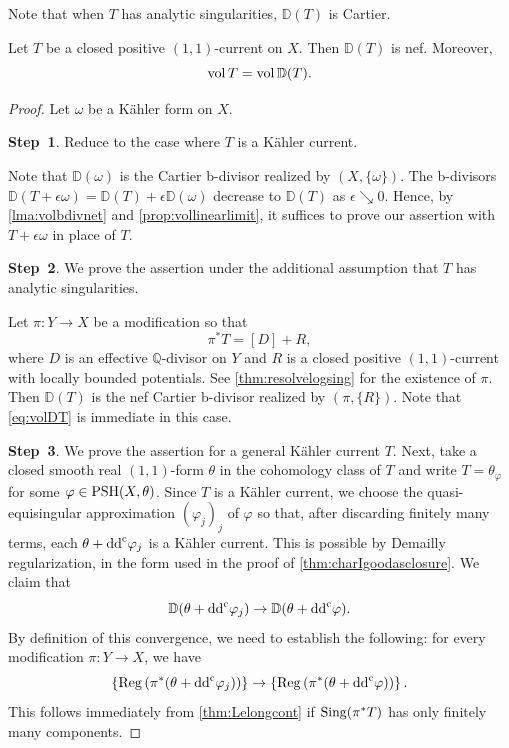 Note that when $T$ has analytic singularities, $\mathbb{D}(T)$ is Cartier.

\begin{theorem}\label{thm:DT}
    Let $T$ be a closed positive $(1,1)$-current on $X$. Then $\mathbb{D}(T)$ is nef. Moreover,
    \begin{equation}\label{eq:volDT}
    \operatorname{vol} T=\operatorname{vol} \mathbb{D}(T).
    \end{equation}
\end{theorem}

\begin{proof}
    Let $\omega$ be a Kähler form on $X$.

    \textbf{Step~1}. Reduce to the case where $T$ is a Kähler current.

    Note that $\mathbb{D}(\omega)$ is the Cartier b-divisor realized by $(X,\{\omega\})$.
    The b-divisors $\mathbb{D}(T+\epsilon\omega)=\mathbb{D}(T)+\epsilon \mathbb{D}(\omega)$ decrease to $\mathbb{D}(T)$ as $\epsilon\searrow 0$. Hence, by \cref{lma:volbdivnet} and \cref{prop:vollinearlimit}, it suffices to prove our assertion with $T+\epsilon\omega$ in place of $T$.

    \textbf{Step~2}. We prove the assertion under the additional assumption that $T$ has analytic singularities.

    Let $\pi\colon Y\rightarrow X$ be a modification so that
    \[
    \pi^*T=[D]+R,
    \]
    where $D$ is an effective $\mathbb{Q}$-divisor on $Y$ and $R$ is a closed positive $(1,1)$-current with locally bounded potentials. See \cref{thm:resolvelogsing} for the existence of $\pi$.
    Then $\mathbb{D}(T)$ is the nef Cartier b-divisor realized by $(\pi,\{R\})$. Note that \eqref{eq:volDT} is immediate in this case.

    \textbf{Step~3}. We prove the assertion for a general Kähler current $T$.
    Next, take a closed smooth real $(1,1)$-form $\theta$ in the cohomology class of $T$ and write $T=\theta_{\varphi}$ for some $\varphi\in \mathrm{PSH}(X,\theta)$. Since $T$ is a Kähler current, we choose the quasi-equisingular approximation $(\varphi_j)_j$ of $\varphi$ so that, after discarding finitely many terms, each $\theta+\mathrm{dd}^{\mathrm{c}}\varphi_j$ is a Kähler current. This is possible by Demailly regularization, in the form used in the proof of \cref{thm:charIgoodasclosure}. We claim that
    \begin{equation}\label{eq:conv_bdiv_temp1}
        \mathbb{D}(\theta+\mathrm{dd}^{\mathrm{c}} \varphi_j)\to \mathbb{D}(\theta+\mathrm{dd}^{\mathrm{c}} \varphi).
    \end{equation}
    By definition of this convergence, we need to establish the following: for every modification $\pi\colon Y\rightarrow X$, we have
    \[
        \left\{\operatorname{Reg}\left(\pi^*(\theta+\mathrm{dd}^{\mathrm{c}}\varphi_j)\right)\right\}\to \left\{\operatorname{Reg}\left(\pi^*(\theta+\mathrm{dd}^{\mathrm{c}}\varphi)\right)\right\}.
    \]
    This follows immediately from \cref{thm:Lelongcont} if $\operatorname{Sing} (\pi^*T)$ has only finitely many components.


\end{proof}
